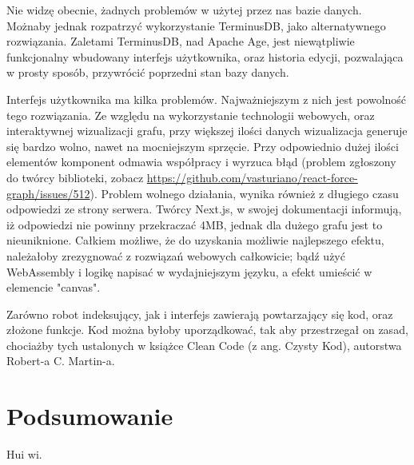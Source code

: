\documentclass[a4paper, 12pt]{article}
\begin{document}
Nie widzę obecnie, żadnych problemów w użytej przez nas bazie danych. Możnaby jednak rozpatrzyć wykorzystanie TerminusDB, jako alternatywnego rozwiązania. Zaletami TerminusDB, nad Apache Age, jest niewątpliwie funkcjonalny wbudowany interfejs użytkownika, oraz historia edycji, pozwalająca w prosty sposób, przywrócić poprzedni stan bazy danych.

Interfejs użytkownika ma kilka problemów. Najważniejszym z nich jest powolność tego rozwiązania. Ze względu na wykorzystanie technologii webowych, oraz interaktywnej wizualizacji grafu, przy większej ilości danych wizualizacja generuje się bardzo wolno, nawet na mocniejszym sprzęcie. Przy odpowiednio dużej ilości elementów komponent odmawia współpracy i wyrzuca błąd (problem zgłoszony do twórcy biblioteki, zobacz \url{https://github.com/vasturiano/react-force-graph/issues/512}). Problem wolnego działania, wynika również z długiego czasu odpowiedzi ze strony serwera. Twórcy Next.js, w swojej dokumentacji informują, iż odpowiedzi nie powinny przekraczać 4MB, jednak dla dużego grafu jest to nieuniknione.\cite{nextDoc4MB} Całkiem możliwe, że do uzyskania możliwie najlepszego efektu, należałoby zrezygnować z rozwiązań webowych całkowicie; bądź użyć WebAssembly i logikę napisać w wydajniejszym języku, a efekt umieścić w elemencie "canvas".

Zarówno robot indeksujący, jak i interfejs zawierają powtarzający się kod, oraz złożone funkcje. Kod można byłoby uporządkować, tak aby przestrzegał on zasad, chociażby tych ustalonych w książce Clean Code (z ang. Czysty Kod), autorstwa Robert-a C. Martin-a.

\section{Podsumowanie}
Hui wi.

\printbibliography
\listoffigures
\end{document}
